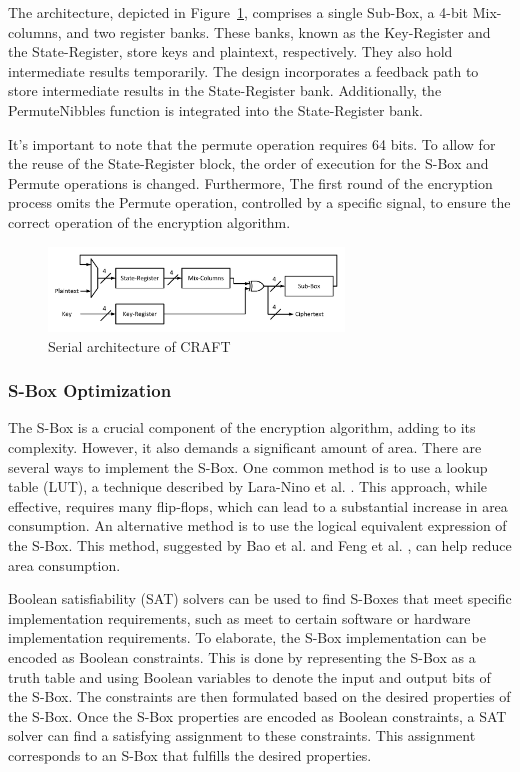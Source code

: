 \documentclass[final,5p,times,twocolumn]{elsarticle}
\begin{document}
The architecture, depicted in Figure~\ref{fig3}, comprises a single Sub-Box, a 4-bit Mix-columns, and two register banks.
These banks, known as the Key-Register and the State-Register, store keys and plaintext, respectively.
They also hold intermediate results temporarily.
The design incorporates a feedback path to store intermediate results in the State-Register bank.
Additionally, the PermuteNibbles function is integrated into the State-Register bank.

It's important to note that the permute operation requires 64 bits.
To allow for the reuse of the State-Register block, the order of execution for the S-Box and Permute operations is changed.
Furthermore, The first round of the encryption process omits the Permute operation, controlled by a specific signal, to ensure the correct operation of the encryption algorithm.

\begin{figure}[h]%
    \centering
    \includegraphics[width=0.7\textwidth]{./fig/serial-archticture.pdf}
    \caption{Serial architecture of CRAFT}\label{fig3}
\end{figure}


\subsubsection{S-Box Optimization }\label{subsubsec1}


The S-Box is a crucial component of the encryption algorithm, adding to its complexity. However, it also demands a significant amount of area. There are several ways to implement the S-Box. One common method is to use a lookup table (LUT), a technique described by Lara-Nino et al. \cite{LaraNino2017}. This approach, while effective, requires many flip-flops, which can lead to a substantial increase in area consumption. An alternative method is to use the logical equivalent expression of the S-Box. This method, suggested by Bao et al. \cite{bao2019peigen} and Feng et al. \cite{Feng2023}, can help reduce area consumption.

Boolean satisfiability (SAT) solvers can be used to find S-Boxes that meet specific implementation requirements, such as meet to certain software or hardware implementation requirements. To elaborate, the S-Box implementation can be encoded as Boolean constraints. This is done by representing the S-Box as a truth table and using Boolean variables to denote the input and output bits of the S-Box. The constraints are then formulated based on the desired properties of the S-Box. Once the S-Box properties are encoded as Boolean constraints, a SAT solver can find a satisfying assignment to these constraints. This assignment corresponds to an S-Box that fulfills the desired properties.
\end{document}
